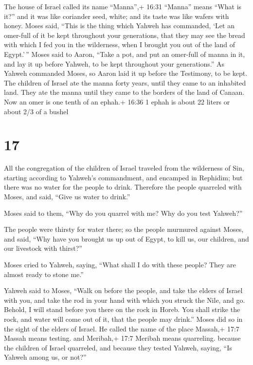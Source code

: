  The house of Israel called its name ``Manna'',+ 16:31
``Manna'' means ``What is it?'' and it was like coriander seed, white;
and its taste was like wafers with honey.  Moses said,
``This is the thing which Yahweh has commanded, `Let an omer-full of it
be kept throughout your generations, that they may see the bread with
which I fed you in the wilderness, when I brought you out of the land of
Egypt.'\,''  Moses said to Aaron, ``Take a pot, and put an
omer-full of manna in it, and lay it up before Yahweh, to be kept
throughout your generations.''  As Yahweh commanded Moses,
so Aaron laid it up before the Testimony, to be kept.  The
children of Israel ate the manna forty years, until they came to an
inhabited land. They ate the manna until they came to the borders of the
land of Canaan.  Now an omer is one tenth of an ephah.+
16:36 1 ephah is about 22 liters or about 2/3 of a bushel

\hypertarget{section-16}{%
\section{17}\label{section-16}}

 All the congregation of the children of Israel traveled
from the wilderness of Sin, starting according to Yahweh's commandment,
and encamped in Rephidim; but there was no water for the people to
drink.  Therefore the people quarreled with Moses, and said,
``Give us water to drink.''

Moses said to them, ``Why do you quarrel with me? Why do you test
Yahweh?''

 The people were thirsty for water there; so the people
murmured against Moses, and said, ``Why have you brought us up out of
Egypt, to kill us, our children, and our livestock with thirst?''

 Moses cried to Yahweh, saying, ``What shall I do with these
people? They are almost ready to stone me.''

 Yahweh said to Moses, ``Walk on before the people, and take
the elders of Israel with you, and take the rod in your hand with which
you struck the Nile, and go.  Behold, I will stand before
you there on the rock in Horeb. You shall strike the rock, and water
will come out of it, that the people may drink.'' Moses did so in the
sight of the elders of Israel.  He called the name of the
place Massah,+ 17:7 Massah means testing. and Meribah,+ 17:7 Meribah
means quarreling. because the children of Israel quarreled, and because
they tested Yahweh, saying, ``Is Yahweh among us, or not?''

